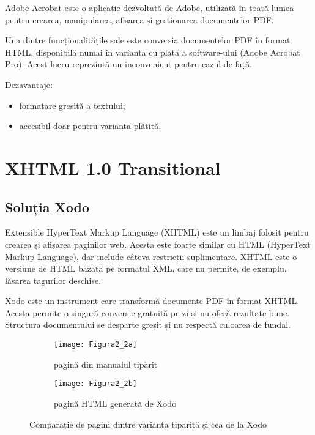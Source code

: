 Adobe Acrobat \cite{padova2008adobe} este o aplicație dezvoltată de Adobe, utilizată în toată lumea pentru crearea, manipularea, afișarea și gestionarea documentelor PDF.

Una dintre funcționalitățile sale este conversia documentelor PDF în format HTML, disponibilă numai în varianta cu plată a software-ului (Adobe Acrobat Pro). Acest lucru reprezintă un inconvenient pentru cazul de față.
\vspace{1em}

\noindent
Dezavantaje:
\begin{itemize}
	\item formatare greșită a textului;
	\item accesibil doar pentru varianta plătită.
\end{itemize}



\section{XHTML 1.0 Transitional}
\subsection{Soluția Xodo}

Extensible HyperText Markup Language (XHTML) \cite{musciano2006html} este un limbaj folosit pentru crearea și afișarea paginilor web. Acesta este foarte similar cu HTML (HyperText Markup Language), dar include câteva restricții suplimentare. XHTML este o versiune de HTML bazată pe formatul XML, care nu permite, de exemplu, lăsarea tagurilor deschise.

Xodo este un instrument care transformă documente PDF în format XHTML. Acesta permite o singură conversie gratuită pe zi și nu oferă rezultate bune. Structura documentului se desparte greșit și nu respectă culoarea de fundal.
\begin{figure}[H]
	\centering
	\begin{subfigure}{.5\textwidth}
		\centering
		\texttt{[image: Figura2\_2a]}
		\caption{pagină din manualul tipărit}
		\label{fig:Figura2_2a}
	\end{subfigure}%
	\begin{subfigure}{.5\textwidth}
		\centering
		\texttt{[image: Figura2\_2b]}
		\caption{pagină HTML generată de Xodo}
		\label{fig:Figura2_2b}
	\end{subfigure}
	\caption{Comparație de pagini dintre varianta tipărită și cea de la Xodo}
	\label{fig:Figura2_2}
\end{figure}

